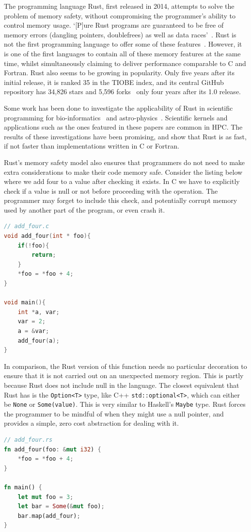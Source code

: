 \documentclass{report}[a4]
\begin{document}
The programming language Rust, first released in 2014, attempts to solve the problem of memory safety, without compromising the programmer's ability to control memory usage. `[P]ure Rust programs are guaranteed to be free of memory errors (dangling pointers, doublefrees) as well as data races'~\cite{Matsakis:2014}. Rust is not the first programming language to offer some of these features~\cite{Manson:2005:JMM:1047659.1040336, pygc, jones1996concurrent}. However, it is one of the first languages to contain all of these memory features at the same time, whilst simultaneously claiming to deliver performance comparable to C and Fortran. Rust also seems to be growing in popularity. Only five years after its initial release, it is ranked 35 in the TIOBE index, and its central GitHub repository has 34,826 stars and 5,596 forks~\cite{rustgit} only four years after its 1.0 release.

Some work has been done to investigate the applicability of Rust in scientific programming for bio-informatics~\cite{bioinformatics} and astro-physics~\cite{blanco-cuaresma_bolmont_2016}. Scientific kernels and applications such as the ones featured in these papers are common in HPC. The results of these investigations have been promising, and show that Rust is as fast, if not faster than implementations written in C or Fortran.

Rust's memory safety model also ensures that programmers do not need to make extra considerations to make their code memory safe. Consider the listing below where we add four to a value after checking it exists. In C we have to explicitly check if a value is null or not before proceeding with the operation. The programmer may forget to include this check, and potentially corrupt memory used by another part of the program, or even crash it.

\begin{lstlisting}[language=C]
// add_four.c
void add_four(int * foo){
    if(!foo){
        return;
    }
    *foo = *foo + 4;
}

void main(){
    int *a, var;
    var = 2;
    a = &var;
    add_four(a);
}

\end{lstlisting}
In comparison, the Rust version of this function needs no particular decoration to ensure that it is not carried out on an unexpected memory region. This is partly because Rust does not include null in the language. The closest equivalent that Rust has is the \texttt{Option<T>} type, like C++  \texttt{std::optional<T>}, which can either be \texttt{None} or \texttt{Some(value)}. This is very similar to Haskell's \texttt{Maybe} type. Rust forces the programmer to be mindful of when they might use a null pointer, and provides a simple, zero cost abstraction for dealing with it.
\begin{lstlisting}[language=Rust]
// add_four.rs
fn add_four(foo: &mut i32) {
    *foo = *foo + 4;
}

fn main() {
    let mut foo = 3;
    let bar = Some(&mut foo);
    bar.map(add_four);
}
\end{lstlisting}
\end{document}
